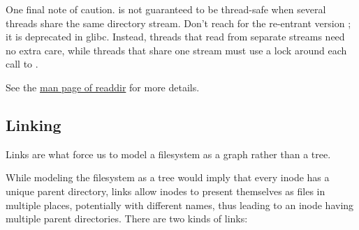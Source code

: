 One final note of caution.
 is not guaranteed to be thread-safe when several threads share the same directory stream.
Don't reach for the re-entrant version ; it is deprecated in glibc.
Instead, threads that read from separate  streams need no extra care, while threads that share one  stream must use a lock around each call to .

See the \href{https://linux.die.net/man/3/readdir}{man page of readdir} for more details.

\subsection{Linking}

Links are what force us to model a filesystem as a graph rather than a tree.

While modeling the filesystem as a tree would imply that every inode has a unique parent directory, links allow inodes to present themselves as files in multiple places, potentially with different names, thus leading to an inode having multiple parent directories.
There are two kinds of links:

